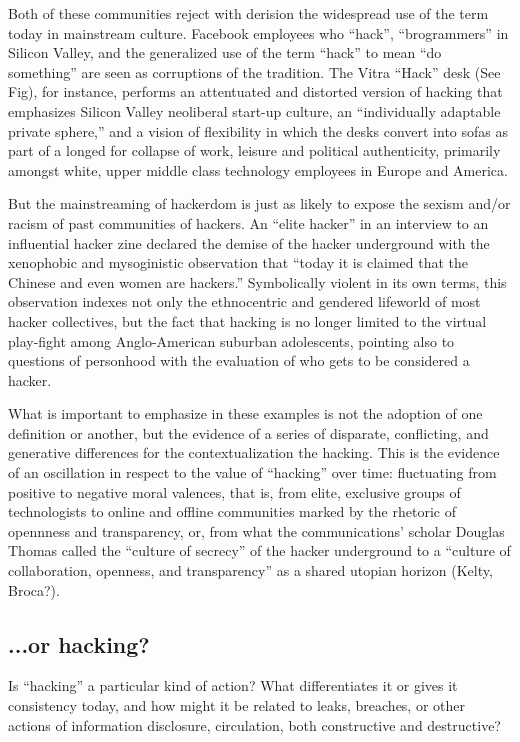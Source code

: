 \documentclass[10pt,letter,oneside]{scrartcl}
\begin{document}
Both of these communities reject with derision the widespread use of the term today in mainstream culture.  Facebook employees who ``hack'', ``brogrammers'' in Silicon Valley, and the generalized use of the term ``hack'' to mean ``do something'' are seen as corruptions of the tradition.   The Vitra ``Hack'' desk (See Fig), for instance, performs an attentuated and distorted version of hacking that emphasizes Silicon Valley neoliberal start-up culture, an ``individually adaptable private sphere,'' and a vision of flexibility in which the desks convert into sofas as part of a longed for collapse of work, leisure and political authenticity, primarily amongst white, upper middle class technology employees in Europe and America. 

But the mainstreaming of hackerdom is just as likely to expose the sexism and/or racism of past communities of hackers.  An ``elite hacker'' in an interview to an influential hacker zine declared the demise of the hacker underground with the xenophobic and mysoginistic observation that ``today it is claimed that the Chinese and even women are hackers.'' %
Symbolically violent in its own terms, this observation indexes not only the ethnocentric and gendered lifeworld of most hacker collectives, but the fact that hacking is no longer limited to the virtual play-fight among Anglo-American suburban adolescents, pointing also to questions of personhood with the evaluation of who gets to be considered a hacker.

What is important to emphasize in these examples is not the adoption of one definition or another, but the evidence of a series of disparate, conflicting, and generative differences for the contextualization the hacking. This is the evidence of an oscillation in respect to the value of ``hacking'' over time: fluctuating from positive to negative moral valences, that is, from elite, exclusive groups of technologists to online and offline communities marked by the rhetoric of opennness and transparency, or, from what the communications' scholar Douglas Thomas called the ``culture of secrecy'' of the hacker underground to a ``culture of collaboration, openness, and transparency'' as a shared utopian horizon (Kelty, Broca?).

\subsection{...or hacking?}

Is ``hacking'' a particular kind of action?  What differentiates it or gives it consistency today, and how might it be related to leaks, breaches, or other actions of information disclosure, circulation, both constructive and destructive?
\end{document}
